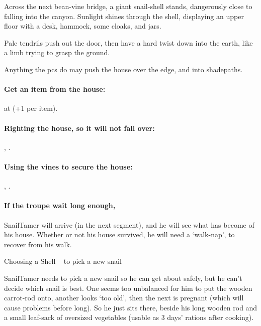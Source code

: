 \begin{boxtext}
  Across the next bean-vine bridge, a giant snail-shell stands, dangerously close to falling into the canyon.
  Sunlight shines through the shell, displaying an upper floor with a desk, hammock, some cloaks, and jars.

  Pale tendrils push out the door, then have a hard twist down into the earth, like a limb trying to grasp the ground.
\end{boxtext}

Anything the \glspl{pc} do may push the house over the edge, and into \gls{shadepaths}.

\paragraph{Get an item from the house:}
 at \tn[12] (+1 per item).

\paragraph{Righting the house, so it will not fall over:}
, \tn[12].

\paragraph{Using the vines to secure the house:}
, \tn[10].

\paragraph{If the troupe wait long enough,}
\gls{SnailTamer} will arrive (in the next \gls{segment}), and he will see what has become of his house.
Whether or not his house survived, he will need a `walk-nap', to recover from his walk.

{Choosing a Shell}%
{~ to pick a new snail}%

\Gls{SnailTamer} needs to pick a new snail so he can get about safely, but he can't decide which snail is best.
One seems too unbalanced for him to put the wooden carrot-rod onto, another looks `too old', then the next is pregnant (which will cause problems before long).
So he just sits there, beside his long wooden rod and a small leaf-sack of oversized vegetables (usable as 3 days' \glspl{ration} after cooking).

